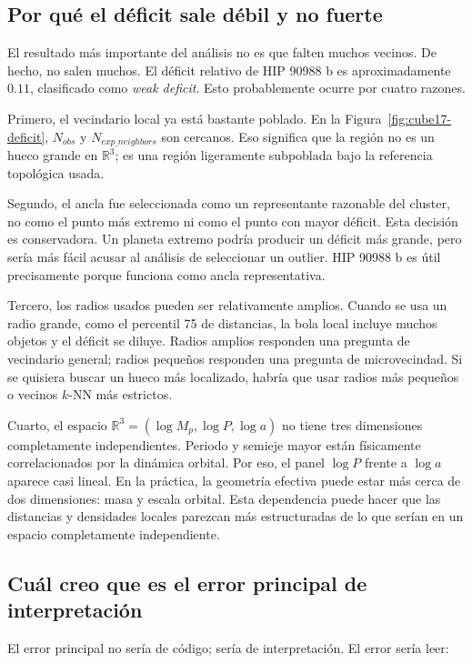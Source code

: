 \documentclass[11pt]{article}
\begin{document}
\subsection{Por qué el déficit sale débil y no fuerte}

El resultado más importante del análisis no es que falten muchos vecinos. De hecho, no salen muchos. El déficit relativo de HIP 90988 b es aproximadamente $0.11$, clasificado como \emph{weak deficit}. Esto probablemente ocurre por cuatro razones.

Primero, el vecindario local ya está bastante poblado. En la Figura~\ref{fig:cube17-deficit}, $N_{obs}$ y $N_{exp\_neighbors}$ son cercanos. Eso significa que la región no es un hueco grande en $\mathbb{R}^3$; es una región ligeramente subpoblada bajo la referencia topológica usada.

Segundo, el ancla fue seleccionada como un representante razonable del cluster, no como el punto más extremo ni como el punto con mayor déficit. Esta decisión es conservadora. Un planeta extremo podría producir un déficit más grande, pero sería más fácil acusar al análisis de seleccionar un outlier. HIP 90988 b es útil precisamente porque funciona como ancla representativa.

Tercero, los radios usados pueden ser relativamente amplios. Cuando se usa un radio grande, como el percentil 75 de distancias, la bola local incluye muchos objetos y el déficit se diluye. Radios amplios responden una pregunta de vecindario general; radios pequeños responden una pregunta de microvecindad. Si se quisiera buscar un hueco más localizado, habría que usar radios más pequeños o vecinos $k$-NN más estrictos.

Cuarto, el espacio $\mathbb{R}^3=(\log M_p,\log P,\log a)$ no tiene tres dimensiones completamente independientes. Periodo y semieje mayor están físicamente correlacionados por la dinámica orbital. Por eso, el panel $\log P$ frente a $\log a$ aparece casi lineal. En la práctica, la geometría efectiva puede estar más cerca de dos dimensiones: masa y escala orbital. Esta dependencia puede hacer que las distancias y densidades locales parezcan más estructuradas de lo que serían en un espacio completamente independiente.

\subsection{Cuál creo que es el error principal de interpretación}

El error principal no sería de código; sería de interpretación. El error sería leer:
\end{document}
